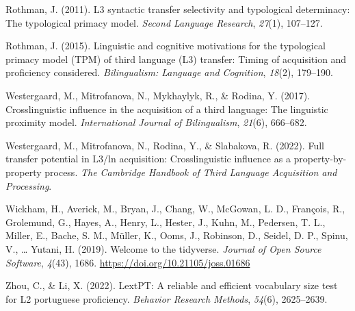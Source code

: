 \documentclass[
  man,floatsintext]{apa6}
\newlength{\cslhangindent}
\newlength{\cslentryspacingunit} %
\newenvironment{CSLReferences}[2] %
 {%
  \setlength{\parindent}{0pt}
  \ifodd #1
  \let\oldpar\par
  \def\par{\hangindent=\cslhangindent\oldpar}
  \fi
  \setlength{\parskip}{#2\cslentryspacingunit}
 }%
 {}
\begin{document}
\begin{CSLReferences}{1}{0}
\leavevmode{}%
Rothman, J. (2011). L3 syntactic transfer selectivity and typological determinacy: The typological primacy model. \emph{Second Language Research}, \emph{27}(1), 107--127.

\leavevmode{}%
Rothman, J. (2015). Linguistic and cognitive motivations for the typological primacy model (TPM) of third language (L3) transfer: Timing of acquisition and proficiency considered. \emph{Bilingualism: Language and Cognition}, \emph{18}(2), 179--190.

\leavevmode{}%
Westergaard, M., Mitrofanova, N., Mykhaylyk, R., \& Rodina, Y. (2017). Crosslinguistic influence in the acquisition of a third language: The linguistic proximity model. \emph{International Journal of Bilingualism}, \emph{21}(6), 666--682.

\leavevmode{}%
Westergaard, M., Mitrofanova, N., Rodina, Y., \& Slabakova, R. (2022). Full transfer potential in L3/ln acquisition: Crosslinguistic influence as a property-by-property process. \emph{The Cambridge Handbook of Third Language Acquisition and Processing}.

\leavevmode{}%
Wickham, H., Averick, M., Bryan, J., Chang, W., McGowan, L. D., François, R., Grolemund, G., Hayes, A., Henry, L., Hester, J., Kuhn, M., Pedersen, T. L., Miller, E., Bache, S. M., Müller, K., Ooms, J., Robinson, D., Seidel, D. P., Spinu, V., \ldots{} Yutani, H. (2019). Welcome to the {tidyverse}. \emph{Journal of Open Source Software}, \emph{4}(43), 1686. \url{https://doi.org/10.21105/joss.01686}

\leavevmode{}%
Zhou, C., \& Li, X. (2022). LextPT: A reliable and efficient vocabulary size test for L2 portuguese proficiency. \emph{Behavior Research Methods}, \emph{54}(6), 2625--2639.

\end{CSLReferences}

\endgroup
\end{document}
